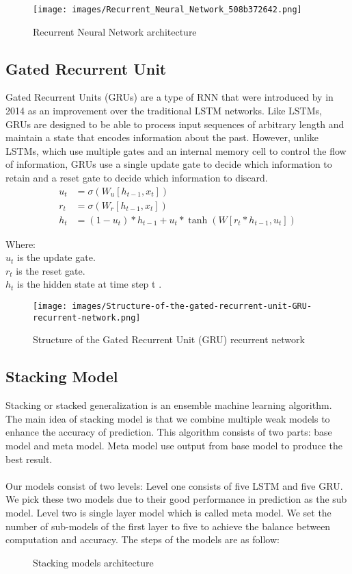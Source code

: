 \documentclass{ieeeojies}
\begin{document}
\begin{figure}[h!]
  \centering
  \texttt{[image: images/Recurrent\_Neural\_Network\_508b372642.png]}
  \caption{Recurrent Neural Network architecture}
  \label{fig:rnn_image}
\end{figure}

\subsection{Gated Recurrent Unit}
Gated Recurrent Units (GRUs) are a type of RNN that were introduced by in 2014 as an improvement over the traditional LSTM networks. Like LSTMs, GRUs are designed to be able to process input sequences of arbitrary length and maintain a state that encodes information about the past. However, unlike LSTMs, which use multiple gates and an internal memory cell to control the flow of information, GRUs use a single update gate to decide which information to retain and a reset gate to decide which information to discard.
\begin{align*}
        u_t &= \sigma(W_u [h_{t-1}, x_t]) \\
    r_t &= \sigma(W_r [h_{t-1}, x_t]) \\
    h_t &= (1 - u_t) \ast h_{t-1} + u_t \ast \tanh(W [r_t \ast h_{t-1}, u_t])
\end{align*}


Where: \\
\indent \textbullet \(u_t\) is the update gate.\\
\indent \textbullet \(r_t\) is the reset gate.\\
\indent \textbullet \(h_t\) is the hidden state at time step t .\\
\begin{figure}[h!]
  \centering
  \texttt{[image: images/Structure-of-the-gated-recurrent-unit-GRU-recurrent-network.png]}
  \caption{Structure of the Gated Recurrent Unit (GRU) recurrent network}
  \label{fig:gru_structure}
\end{figure}
\subsection{Stacking Model}
Stacking or stacked generalization is an ensemble machine learning algorithm. The main idea of stacking model is that we combine multiple weak models to enhance the accuracy of prediction. This algorithm consists of two parts: base model and meta model. Meta model use output from base model to produce the best result.\\ \\
Our models consist of two levels: Level one consists of five LSTM and five GRU. We pick these two models due to their good performance in prediction as the sub model. Level two is single layer model which is called meta model. We set the number of sub-models of the first layer to five to achieve the balance between computation and accuracy. The steps of the models are as follow:
\begin{figure}[h!]
  \centering
  
  \caption{Stacking models architecture}
  \label{fig:stacking_architecture}
\end{figure}
\end{document}
